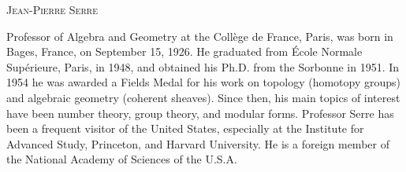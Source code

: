 
\textsc{Jean-Pierre Serre}

Professor of Algebra and Geometry at the Collège de France, Paris, was born
in Bages, France, on September 15, 1926. He graduated from École Normale
Supérieure, Paris, in 1948, and obtained his Ph.D. from the Sorbonne in
1951. In 1954 he was awarded a Fields Medal for his work on topology
(homotopy groups) and algebraic geometry (coherent sheaves). Since then,
his main topics of interest have been number theory, group theory, and
modular forms. Professor Serre has been a frequent visitor of the United
States, especially at the Institute for Advanced Study, Princeton, and
Harvard University. He is a foreign member of the National Academy of
Sciences of the U.S.A.
